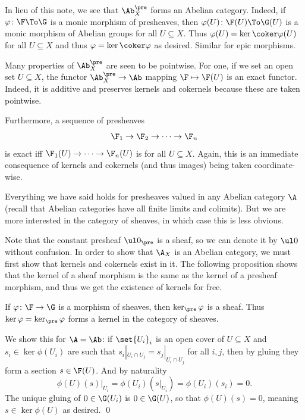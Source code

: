 \eremark

In lieu of this note, we see that $\Ab^\pre_X$ forms an Abelian category.
Indeed, if $\phi\colon\F\To\G$ is a monic morphism of presheaves, then $\phi(U)\colon\F(U)\To\G(U)$ is a monic morphism of Abelian groups
for all $U\subseteq X$.
Thus $\phi(U)=\ker\coker\phi(U)$ for all $U\subseteq X$ and thus $\phi=\ker\coker\phi$ as desired.
Similar for epic morphisms.

Many properties of $\Ab^\pre_X$ are seen to be pointwise.
For one, if we set an open set $U\subseteq X$, the functor $\Ab^\pre_X\to\Ab$ mapping $\F\mapsto\F(U)$ is an exact functor.
Indeed, it is additive and preserves kernels and cokernels because these are taken pointwise.

Furthermore, a sequence of presheaves
$$ \F_1\to\F_2\to\cdots\to\F_n $$
is exact iff $\F_1(U)\to\cdots\to\F_n(U)$ is for all $U\subseteq X$.
Again, this is an immediate consequence of kernels and cokernels (and thus images) being taken coordinate-wise.

Everything we have said holds for presheaves valued in any Abelian category $\A$ (recall that Abelian categories have all finite limits and colimits).
But we are more interested in the category of sheaves, in which case this is less obvious.

Note that the constant presheaf $\ul0_\pre$ is a sheaf, so we can denote it by $\ul0$ without confusion.
In order to show that $\A_X$ is an Abelian category, we must first show that kernels and cokernels exist in it.
The following proposition shows that the kernel of a sheaf morphism is the same as the kernel of a presheaf morphism, and thus we get the existence
of kernels for free.

\bprop

    If $\phi\colon\F\to\G$ is a morphism of sheaves, then $\ker_\pre\phi$ is a sheaf.
    Thus $\ker\phi=\ker_\pre\phi$ forms a kernel in the category of sheaves.

\eprop

\bproof

    We show this for $\A=\Ab$: if $\set{U_i}_i$ is an open cover of $U\subseteq X$ and $s_i\in\ker\phi(U_i)$ are such that
    $s_i|_{U_i\cap U_j}=s_j|_{U_i\cap U_j}$ for all $i,j$, then by gluing they form a section $s\in\F(U)$.
    And by naturality
    $$ \phi(U)(s)|_{U_i}=\phi(U_i)(s|_{U_i})=\phi(U_i)(s_i) = 0 . $$
    The unique gluing of $0\in\G(U_i)$ is $0\in\G(U)$, so that $\phi(U)(s)=0$, meaning $s\in\ker\phi(U)$ as desired.
    \qed

